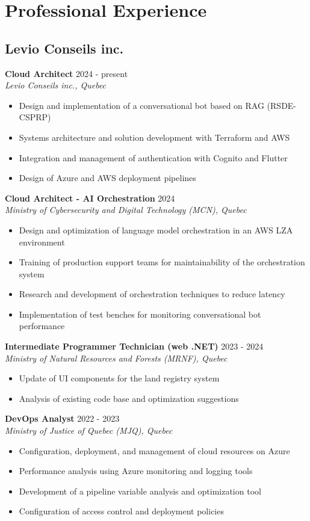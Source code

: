 ﻿\documentclass[11pt,letterpaper]{article}
\begin{document}
\section*{Professional Experience}

\subsection*{Levio Conseils inc.}

\textbf{Cloud Architect} \hfill 2024 - present\\
\textit{Levio Conseils inc., Quebec}
\begin{itemize}
\item Design and implementation of a conversational bot based on RAG (RSDE-CSPRP)
\item Systems architecture and solution development with Terraform and AWS
\item Integration and management of authentication with Cognito and Flutter
\item Design of Azure and AWS deployment pipelines
\end{itemize}

\textbf{Cloud Architect - AI Orchestration} \hfill 2024\\
\textit{Ministry of Cybersecurity and Digital Technology (MCN), Quebec}
\begin{itemize}
\item Design and optimization of language model orchestration in an AWS LZA environment
\item Training of production support teams for maintainability of the orchestration system
\item Research and development of orchestration techniques to reduce latency
\item Implementation of test benches for monitoring conversational bot performance
\end{itemize}

\textbf{Intermediate Programmer Technician (web .NET)} \hfill 2023 - 2024\\
\textit{Ministry of Natural Resources and Forests (MRNF), Quebec}
\begin{itemize}
\item Update of UI components for the land registry system
\item Analysis of existing code base and optimization suggestions
\end{itemize}

\textbf{DevOps Analyst} \hfill 2022 - 2023\\
\textit{Ministry of Justice of Quebec (MJQ), Quebec}
\begin{itemize}
\item Configuration, deployment, and management of cloud resources on Azure
\item Performance analysis using Azure monitoring and logging tools
\item Development of a pipeline variable analysis and optimization tool
\item Configuration of access control and deployment policies
\end{itemize}
\end{document}

